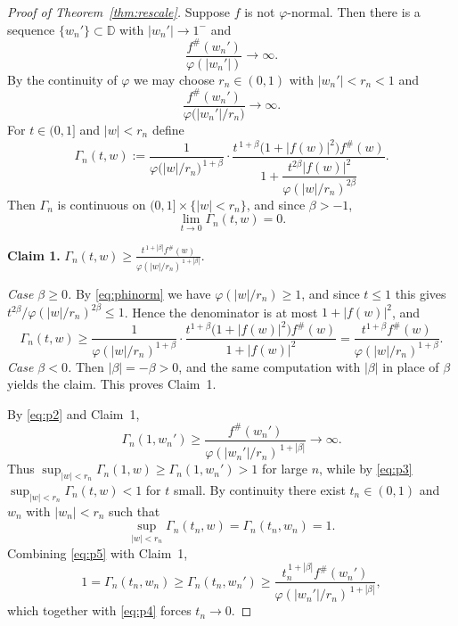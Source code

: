 \documentclass[10pt,a4paper]{amsart}
\newcommand{\D}{\mathbb{D}}
\begin{document}
\begin{proof}[Proof of Theorem~\textup{\ref{thm:rescale}}]
Suppose $f$ is not $\varphi$-normal. Then there is a sequence $\{w_{n}'\}\subset\D$ with
$|w_{n}'|\to1^{-}$ and
\begin{equation}\label{eq:p1}
\frac{f^{\#}(w_{n}')}{\varphi(|w_{n}'|)}\longrightarrow\infty.
\end{equation}
By the continuity of $\varphi$ we may choose $r_{n}\in(0,1)$ with $|w_{n}'|<r_{n}<1$ and
\begin{equation}\label{eq:p2}
\frac{f^{\#}(w_{n}')}{\varphi\big(|w_{n}'|/r_{n}\big)}\longrightarrow\infty.
\end{equation}
For $t\in(0,1]$ and $|w|<r_{n}$ define
\[
\Gamma_{n}(t,w):=\frac{1}{\varphi\big(|w|/r_{n}\big)^{\,1+\beta}}\cdot
\frac{t^{\,1+\beta}\big(1+|f(w)|^{2}\big)f^{\#}(w)}
{1+\dfrac{t^{2\beta}|f(w)|^{2}}{\varphi(|w|/r_{n})^{2\beta}}}.
\]
Then $\Gamma_{n}$ is continuous on $(0,1]\times\{|w|<r_{n}\}$, and since $\beta>-1$,
\begin{equation}\label{eq:p3}
\lim_{t\to0}\Gamma_{n}(t,w)=0.
\end{equation}

\smallskip
\noindent\textbf{Claim 1.}
$\displaystyle \Gamma_{n}(t,w)\ge\frac{t^{\,1+|\beta|}f^{\#}(w)}{\varphi(|w|/r_{n})^{\,1+|\beta|}}.$

\smallskip
\noindent\emph{Case $\beta\ge0$.} By \eqref{eq:phinorm} we have $\varphi(|w|/r_{n})\ge1$,
and since $t\le1$ this gives $t^{2\beta}/\varphi(|w|/r_{n})^{2\beta}\le1$. Hence the
denominator is at most $1+|f(w)|^{2}$, and
\[
\Gamma_{n}(t,w)\ge\frac{1}{\varphi(|w|/r_{n})^{1+\beta}}\cdot
\frac{t^{1+\beta}\big(1+|f(w)|^{2}\big)f^{\#}(w)}{1+|f(w)|^{2}}
=\frac{t^{1+\beta}f^{\#}(w)}{\varphi(|w|/r_{n})^{1+\beta}}.
\]
\emph{Case $\beta<0$.} Then $|\beta|=-\beta>0$, and the same computation with $|\beta|$ in
place of $\beta$ yields the claim. This proves Claim~1.

\smallskip
By \eqref{eq:p2} and Claim~1,
\begin{equation}\label{eq:p4}
\Gamma_{n}(1,w_{n}')\ge\frac{f^{\#}(w_{n}')}{\varphi(|w_{n}'|/r_{n})^{\,1+|\beta|}}
\longrightarrow\infty.
\end{equation}
Thus $\sup_{|w|<r_{n}}\Gamma_{n}(1,w)\ge\Gamma_{n}(1,w_{n}')>1$ for large $n$, while by
\eqref{eq:p3} $\sup_{|w|<r_{n}}\Gamma_{n}(t,w)<1$ for $t$ small. By continuity there exist
$t_{n}\in(0,1)$ and $w_{n}$ with $|w_{n}|<r_{n}$ such that
\begin{equation}\label{eq:p5}
\sup_{|w|<r_{n}}\Gamma_{n}(t_{n},w)=\Gamma_{n}(t_{n},w_{n})=1.
\end{equation}
Combining \eqref{eq:p5} with Claim~1,
\[
1=\Gamma_{n}(t_{n},w_{n})\ge\Gamma_{n}(t_{n},w_{n}')\ge
\frac{t_{n}^{\,1+|\beta|}f^{\#}(w_{n}')}{\varphi(|w_{n}'|/r_{n})^{\,1+|\beta|}},
\]
which together with \eqref{eq:p4} forces $t_{n}\to0$.


\end{proof}
\end{document}

